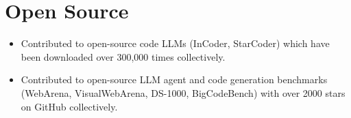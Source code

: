 \section{Open Source}
\begin{itemize}[leftmargin=-0.4mm,partopsep=0pt,label=]
  \item Contributed to open-source code LLMs (InCoder, StarCoder) which have been downloaded over 300,000 times collectively.
  \item Contributed to open-source LLM agent and code generation benchmarks (WebArena, VisualWebArena, DS-1000, BigCodeBench) with over 2000 stars on GitHub collectively.
\end{itemize}
